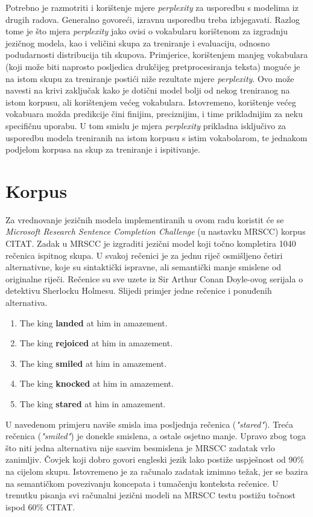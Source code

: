 \documentclass[times, utf8, diplomski, numeric]{fer}
\begin{document}
Potrebno je razmotriti i korištenje mjere \textit{perplexity} za usporedbu s modelima iz drugih radova. Generalno govoreći, izravnu usporedbu treba izbjegavati. Razlog tome je što mjera \textit{perplexity} jako ovisi o vokabularu korištenom za izgradnju jezičnog modela, kao i veličini skupa za treniranje i evaluaciju, odnosno podudarnosti distribucija tih skupova. Primjerice, korištenjem manjeg vokabulara (koji može biti naprosto posljedica drukčijeg pretprocesiranja teksta) moguće je na istom skupu za treniranje postići niže rezultate mjere \textit{perplexity}. Ovo može navesti na krivi zaključak kako je dotični model bolji od nekog treniranog na istom korpusu, ali korištenjem većeg vokabulara. Istovremeno, korištenje većeg vokabuara možda predikcije čini finijim, preciznijim, i time prikladnijim za neku specifičnu uporabu. U tom smislu je mjera \textit{perplexity} prikladna isključivo za usporedbu modela treniranih na istom korpusu s istim vokabolarom, te jednakom podjelom korpusa na skup za treniranje i ispitivanje.

\section{Korpus}

Za vrednovanje jezičnih modela implementiranih u ovom radu koristit će se \textit{Microsoft Research Sentence Completion Challenge} (u nastavku MRSCC) korpus CITAT. Zadak u MRSCC je izgraditi jezični model koji točno kompletira 1040 rečenica ispitnog skupa. U svakoj rečenici je za jednu riječ osmišljeno četiri alternativne, koje su sintaktički ispravne, ali semantički manje smislene od originalne riječi. Rečenice su sve uzete iz Sir Arthur Conan Doyle-ovog serijala o detektivu Sherlocku Holmesu. Slijedi primjer jedne rečenice i ponuđenih alternativa.

\begin{enumerate} 
\item{The king \textbf{landed} at him in amazement.}
\item{The king \textbf{rejoiced} at him in amazement.}
\item{The king \textbf{smiled} at him in amazement.}
\item{The king \textbf{knocked} at him in amazement.}
\item{The king \textbf{stared} at him in amazement.}
\end{enumerate}

U navedenom primjeru naviše smisla ima posljednja rečenica (\textit{"stared"}). Treća rečenica (\textit{"smiled"}) je donekle smislena, a ostale osjetno manje. Upravo zbog toga što niti jedna alternativa nije sasvim besmislena je MRSCC zadatak vrlo zanimljiv. Čovjek koji dobro govori engleski jezik lako postiže uspješnost od 90\% na cijelom skupu. Istovremeno je za računalo zadatak iznimno težak, jer se bazira na semantičkom povezivanju koncepata i tumačenju konteksta rečenice. U trenutku pisanja svi računalni jezični modeli na MRSCC testu postižu točnost ispod 60\% CITAT.
\end{document}
